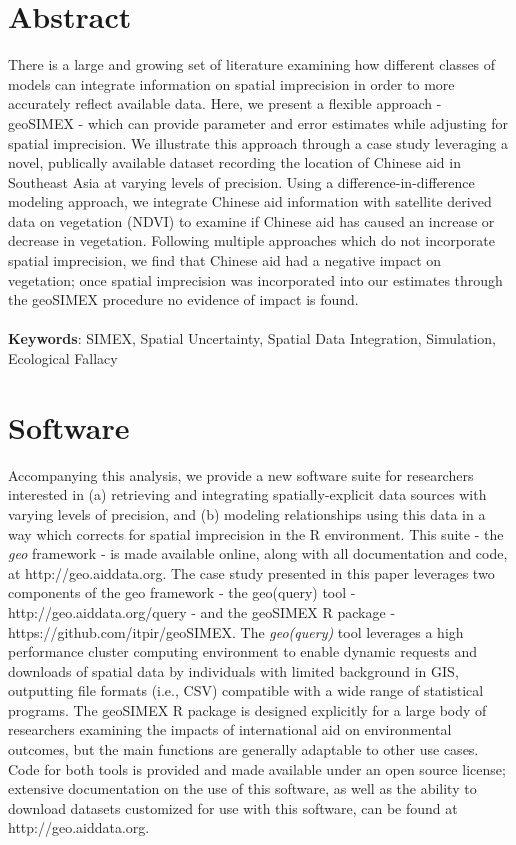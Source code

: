 \section{Abstract}
There is a large and growing set of literature examining how different classes of models can integrate information on spatial imprecision in order to more accurately reflect available data. Here, we present a flexible approach - geoSIMEX - which can provide parameter and error estimates while adjusting for spatial imprecision.
We illustrate this approach through a case study leveraging a novel, publically available dataset recording the location of Chinese aid in Southeast Asia at varying levels of precision.
Using a difference-in-difference modeling approach, we integrate Chinese aid information with satellite derived data on vegetation (NDVI) to examine if Chinese aid has caused an increase or decrease in vegetation.
Following multiple approaches which do not incorporate spatial imprecision, we find that Chinese aid had a negative impact on vegetation; once spatial imprecision was incorporated into our estimates through the geoSIMEX procedure no evidence of impact is found. \\
\\
\textbf{Keywords}: SIMEX, Spatial Uncertainty, Spatial Data Integration, Simulation, Ecological Fallacy\\

\newpage
\section{Software}
Accompanying this analysis, we provide a new software suite for researchers interested in (a) retrieving and integrating spatially-explicit data sources with varying levels of precision, and (b) modeling relationships using this data in a way which corrects for spatial imprecision in the R environment.  This suite - the \textit{geo} framework - is made available online, along with all documentation and code, at http://geo.aiddata.org.  The case study presented in this paper leverages two components of the geo framework - the geo(query) tool - http://geo.aiddata.org/query - and the geoSIMEX R package - https://github.com/itpir/geoSIMEX. The \textit{geo(query)} tool leverages a high performance cluster computing environment to enable dynamic requests and downloads of spatial data by individuals with limited background in GIS, outputting file formats (i.e., CSV) compatible with a wide range of statistical programs.  The geoSIMEX R package is designed explicitly for a large body of researchers examining the impacts of international aid on environmental outcomes, but the main functions are generally adaptable to other use cases. Code for both tools is provided and made available under an open source license; extensive documentation on the use of this software, as well as the ability to download datasets customized for use with this software, can be found at http://geo.aiddata.org.
\newpage

